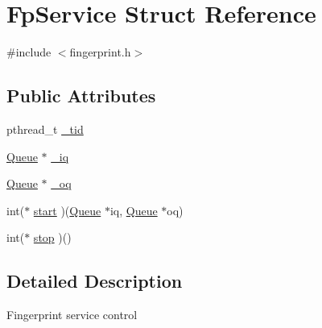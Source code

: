\hypertarget{structFpService}{\section{\-Fp\-Service \-Struct \-Reference}
\label{structFpService}
}


{\ttfamily \#include $<$fingerprint.\-h$>$}

\subsection*{\-Public \-Attributes}
\begin{DoxyCompactItemize}
\item 
pthread\-\_\-t \hyperlink{structFpService_a94191c2fd018c83395922a6a6d490f5d}{\-\_\-tid}
\item 
\hyperlink{structQueue}{\-Queue} $\ast$ \hyperlink{structFpService_a0da51b062ecfa7d09074af07f6258581}{\-\_\-iq}
\item 
\hyperlink{structQueue}{\-Queue} $\ast$ \hyperlink{structFpService_a78ba06235033bd5d83a7f425ef49fc49}{\-\_\-oq}
\item 
int($\ast$ \hyperlink{structFpService_a8dc45a1cac37860a976a44674e4ddc70}{start} )(\hyperlink{structQueue}{\-Queue} $\ast$iq, \hyperlink{structQueue}{\-Queue} $\ast$oq)
\item 
int($\ast$ \hyperlink{structFpService_a62ef18396745d1ea3de0efab1a90f1fb}{stop} )()
\end{DoxyCompactItemize}


\subsection{\-Detailed \-Description}
\-Fingerprint service control 

